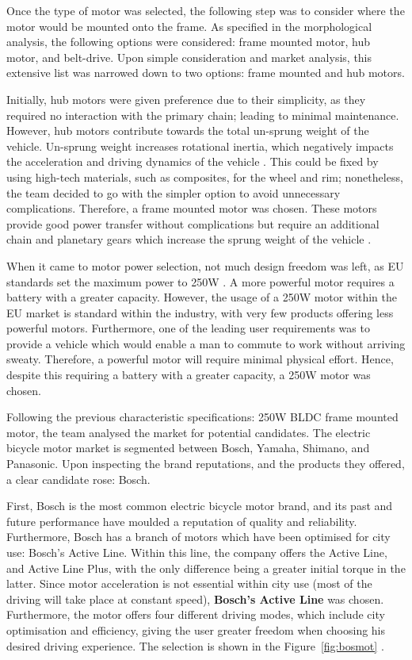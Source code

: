 \documentclass[a4paper,11pt]{article}
\begin{document}
Once the type of motor was selected, the following step was to consider where the motor would be mounted onto the frame. As specified in the morphological analysis, the following options were considered: frame mounted motor, hub motor, and belt-drive. Upon simple consideration and market analysis, this extensive list was narrowed down to two options: frame mounted and hub motors. 

Initially, hub motors were given preference due to their simplicity, as they required no interaction with the primary chain; leading to minimal maintenance. However, hub motors contribute towards the total un-sprung weight of the vehicle. Un-sprung weight increases rotational inertia, which negatively impacts the acceleration and driving dynamics of the vehicle \cite{fen13}. This could be fixed by using high-tech materials, such as composites, for the wheel and rim; nonetheless, the team decided to go with the simpler option to avoid unnecessary complications. Therefore, a frame mounted motor was chosen. These motors provide good power transfer without complications but require an additional chain and planetary gears which increase the sprung weight of the vehicle \cite{rag14}. 

When it came to motor power selection, not much design freedom was left, as EU standards set the maximum power to 250W \cite{15194}. A more powerful motor requires a battery with a greater capacity. However, the usage of a 250W motor within the EU market is standard within the industry, with very few products offering less powerful motors. Furthermore, one of the leading user requirements was to provide a vehicle which would enable a man to commute to work without arriving sweaty. Therefore, a powerful motor will require minimal physical effort. Hence, despite this requiring a battery with a greater capacity, a 250W motor was chosen. 

Following the previous characteristic specifications: 250W BLDC frame mounted motor, the team analysed the market for potential candidates. The electric bicycle motor market is segmented between Bosch, Yamaha, Shimano, and Panasonic. Upon inspecting the brand reputations, and the products they offered, a clear candidate rose: Bosch. 

First, Bosch is the most common electric bicycle motor brand, and its past and future performance have moulded a reputation of quality and reliability. Furthermore, Bosch has a branch of motors which have been optimised for city use: Bosch's Active Line. Within this line, the company offers the Active Line, and Active Line Plus, with the only difference being a greater initial torque in the latter. Since motor acceleration is not essential within city use (most of the driving will take place at constant speed), \textbf{Bosch's Active Line} was chosen. Furthermore, the motor offers four different driving modes, which include city optimisation and efficiency, giving the user greater freedom when choosing his desired driving experience. The selection is shown in the Figure~\ref{fig:bosmot} \cite{bosch18}.
\end{document}

